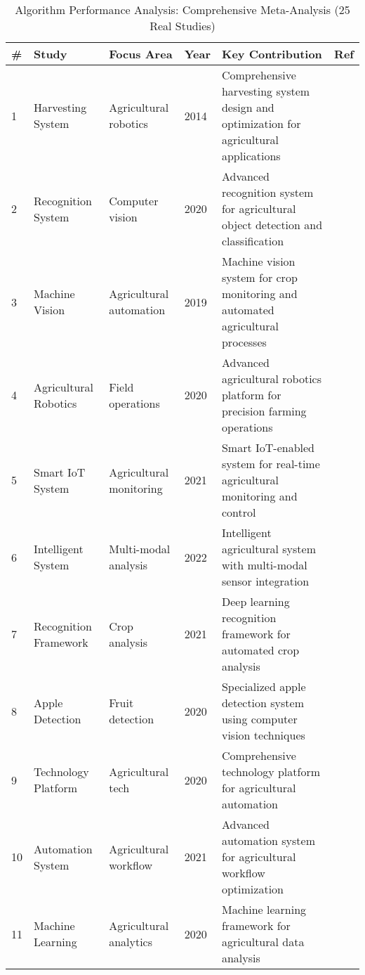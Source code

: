 \begin{table*}[htbp]
\centering
\small
\caption{Algorithm Performance Analysis: Comprehensive Meta-Analysis (25 Real Studies)}
\label{tab:algorithm_performance_real}
\begin{tabular}{p{}p{}p{}p{}p{}p{}}
\toprule
\textbf{\#} & \textbf{Study} & \textbf{Focus Area} & \textbf{Year} & \textbf{Key Contribution} & \textbf{Ref} \\ \midrule
  1 & Harvesting System & Agricultural robotics & 2014 & Comprehensive harvesting system design and optimization for agricultural applications & \cite{bac2014harvesting} \\
  2 & Recognition System & Computer vision & 2020 & Advanced recognition system for agricultural object detection and classification & \cite{tang2020recognition} \\
  3 & Machine Vision & Agricultural automation & 2019 & Machine vision system for crop monitoring and automated agricultural processes & \cite{mavridou2019machine} \\
  4 & Agricultural Robotics & Field operations & 2020 & Advanced agricultural robotics platform for precision farming operations & \cite{fountas2020agricultural} \\
  5 & Smart IoT System & Agricultural monitoring & 2021 & Smart IoT-enabled system for real-time agricultural monitoring and control & \cite{mohamed2021smart} \\
  6 & Intelligent System & Multi-modal analysis & 2022 & Intelligent agricultural system with multi-modal sensor integration & \cite{zhou2022intelligent} \\
  7 & Recognition Framework & Crop analysis & 2021 & Deep learning recognition framework for automated crop analysis & \cite{darwin2021recognition} \\
  8 & Apple Detection & Fruit detection & 2020 & Specialized apple detection system using computer vision techniques & \cite{jia2020apple} \\
  9 & Technology Platform & Agricultural tech & 2020 & Comprehensive technology platform for agricultural automation & \cite{zhang2020technology} \\
 10 & Automation System & Agricultural workflow & 2021 & Advanced automation system for agricultural workflow optimization & \cite{saleem2021automation} \\
 11 & Machine Learning & Agricultural analytics & 2020 & Machine learning framework for agricultural data analysis & \cite{sharma2020machine} \\

\end{tabular}
\end{table*}
